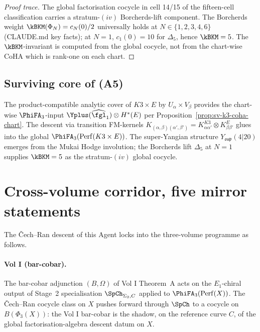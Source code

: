 \begin{proof}[Proof trace]
The global factorisation cocycle in cell 14/15 of the
fifteen-cell classification carries a stratum-$(iv)$ Borcherds-lift
component. The Borcherds weight $\kBKM(\Phi_N) = c_N(0)/2$ universally
holds at $N \in \{1, 2, 3, 4, 6\}$ (CLAUDE.md key facts); at $N = 1$,
$c_1(0) = 10$ for $\Delta_5$, hence $\kBKM = 5$. The
$\kBKM$-invariant is computed from the global cocycle, not from the
chart-wise CoHA which is rank-one on each chart.
\end{proof}

\subsection*{Surviving core of (A5)}

The product-compatible analytic cover of $K3 \times E$ by
$U_\alpha \times V_\beta$ provides the chart-wise $\PhiFA_3$-input
$\Yplus(\widehat{\fgl}_1) \otimes H^\ast(E)$ per
Proposition~\ref{prop:sv-k3-coha-chart}. The descent via transition
FM-kernels $K_{(\alpha,\beta)(\alpha',\beta')} = K^{K3}_{\alpha\alpha'}
\otimes K^E_{\beta\beta'}$ glues into the global
$\PhiFA_3(\mathrm{Perf}(K3 \times E))$. The super-Yangian structure
$Y_{\mathfrak{osp}}(4|20)$ emerges from the Mukai Hodge involution;
the Borcherds lift $\Delta_5$ at $N = 1$ supplies
$\kBKM = 5$ as the stratum-$(iv)$ global cocycle.

\section{Cross-volume corridor, five mirror statements}

The Čech--Ran descent of this Agent locks into the
three-volume programme as follows.

\paragraph{Vol I (bar-cobar).} The bar-cobar adjunction
$(B, \Omega)$ of Vol I Theorem~A acts on the $E_1$-chiral output of
Stage~2 specialisation $\SpCh_{\Sigma_2, C}$ applied to
$\PhiFA_3(\mathrm{Perf}(X))$. The Čech--Ran cocycle class on $X$
pushes forward through $\SpCh$ to a cocycle on $B(\Phi_3(X))$:
the Vol I bar-cobar is the shadow, on the reference curve $C$, of
the global factorisation-algebra descent datum on $X$.

